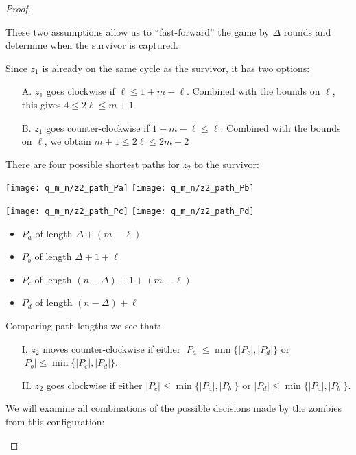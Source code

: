 \begin{proof}
\begin{proofpart}
  These two assumptions allow us to ``fast-forward'' the game by $\Delta$ rounds
  and determine when the survivor is captured.

  Since $z_1$ is already on the same cycle as the survivor, it has two options:

  \begin{itemize}
   \item[A.] $z_1$ goes clockwise if $\ell \leq 1 + m - \ell$.
         Combined with the bounds on $\ell$, this gives $4 \leq 2 \ell \leq m + 1$

   \item[B.] $z_1$ goes counter-clockwise if $1 + m - \ell \leq \ell$.
         Combined with the bounds on $\ell$, we obtain $m + 1 \leq 2 \ell \leq 2m - 2$
  \end{itemize}

  There are four possible shortest paths for $z_2$ to the survivor:

  \begin{center}
    \texttt{[image: q\_m\_n/z2\_path\_Pa]}
    \texttt{[image: q\_m\_n/z2\_path\_Pb]}

    \texttt{[image: q\_m\_n/z2\_path\_Pc]}
    \texttt{[image: q\_m\_n/z2\_path\_Pd]}
  \end{center}

  \begin{itemize}
   \item $P_a$ of length $\Delta + (m - \ell)$
   \item $P_b$ of length $\Delta + 1 + \ell$
   \item $P_c$ of length $(n-\Delta) + 1 + (m-\ell)$
   \item $P_d$ of length $(n-\Delta) + \ell$
  \end{itemize}

  Comparing path lengths we see that:

  \begin{itemize}
   \item[I.] $z_2$ moves counter-clockwise if either $|P_a| \leq \min \{ |P_c|, |P_d| \}$ or $|P_b| \leq \min \{ |P_c|, |P_d| \}$.

   \item[II.] $z_2$ goes clockwise if either $|P_c| \leq \min \{ |P_a|, |P_b| \}$ or $|P_d| \leq \min \{ |P_a|, |P_b| \}$.
  \end{itemize}

  We will examine all combinations of the possible decisions
  made by the zombies from this configuration:


\end{proofpart}
\end{proof}

